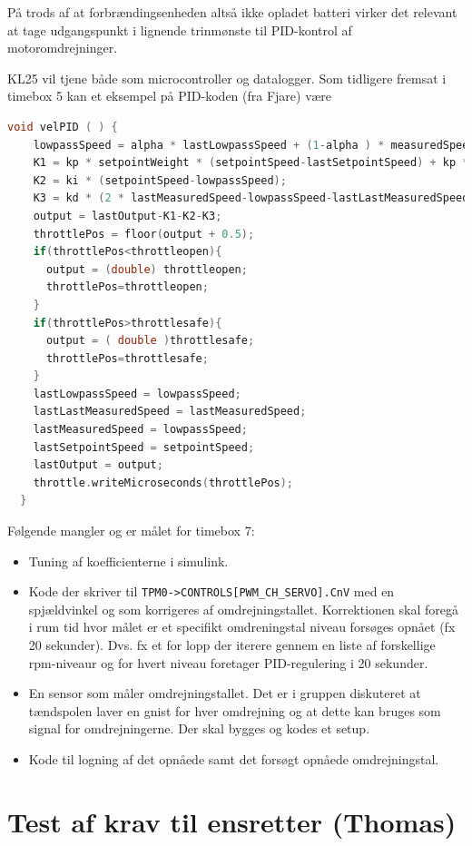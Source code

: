 På trods af at forbrændingsenheden altså ikke opladet batteri virker det relevant at tage udgangspunkt i lignende trinmønste til PID-kontrol af motoromdrejninger.

KL25 vil tjene både som microcontroller og datalogger. Som tidligere fremsat i timebox 5 kan et eksempel på PID-koden (fra Fjare\autocite{pid1}) være
\clearpage
\begin{lstlisting}[language=C,basicstyle=\ttfamily]
  void velPID ( ) {
    lowpassSpeed = alpha * lastLowpassSpeed + (1-alpha ) * measuredSpeed;
    K1 = kp * setpointWeight * (setpointSpeed-lastSetpointSpeed) + kp * (lastMeasuredSpeed-lowpassSpeed);
    K2 = ki * (setpointSpeed-lowpassSpeed);
    K3 = kd * (2 * lastMeasuredSpeed-lowpassSpeed-lastLastMeasuredSpeed);
    output = lastOutput-K1-K2-K3;
    throttlePos = floor(output + 0.5);
    if(throttlePos<throttleopen){
      output = (double) throttleopen;
      throttlePos=throttleopen;
    }
    if(throttlePos>throttlesafe){
      output = ( double )throttlesafe;
      throttlePos=throttlesafe;
    }
    lastLowpassSpeed = lowpassSpeed;
    lastLastMeasuredSpeed = lastMeasuredSpeed;
    lastMeasuredSpeed = lowpassSpeed;
    lastSetpointSpeed = setpointSpeed;
    lastOutput = output;
    throttle.writeMicroseconds(throttlePos);
  }
\end{lstlisting}


Følgende mangler og er målet for timebox 7:
\begin{itemize}
\item Tuning af koefficienterne i simulink.
\item Kode der skriver til \lstinline{TPM0->CONTROLS[PWM_CH_SERVO].CnV} med en spjældvinkel og som korrigeres af omdrejningstallet. Korrektionen skal foregå i rum tid hvor målet er et specifikt omdreningstal niveau forsøges opnået (fx 20 sekunder). Dvs. fx et for lopp der iterere gennem en liste af forskellige rpm-niveaur og for hvert niveau foretager PID-regulering i 20 sekunder.
\item En sensor som måler omdrejningstallet. Det er i gruppen diskuteret at tændspolen laver en gnist for hver omdrejning og at dette kan bruges som signal for omdrejningerne. Der skal bygges og kodes et setup.
\item Kode til logning af det opnåede samt det forsøgt opnåede omdrejningstal.
\end{itemize}
\clearpage
\section{Test af krav til ensretter (Thomas)}
\label{sec:test-af-krav}

